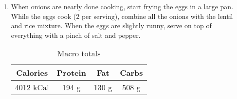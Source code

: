 \begin{multicols}{2}
\begin{enumerate}
\item When onions are nearly done cooking, start frying the eggs in a large pan. While the eggs cook (2 per serving), combine all the onions with the lentil and rice mixture. When the eggs are slightly runny, serve on top of everything with a pinch of salt and pepper. 

 



\begin{table}[H]
  \begin{center}
    \caption{Macro totals}
    \label{tab:table1}
    \begin{tabular}{c|c|c|c} %
      \textbf{Calories} & \textbf{Protein} & \textbf{Fat} & \textbf{Carbs}\\
      \hline
      4012 kCal & 194 g & 130 g & 508 g\\
    \end{tabular}
  \end{center}
\end{table}
 
\end{enumerate}
\end{multicols}